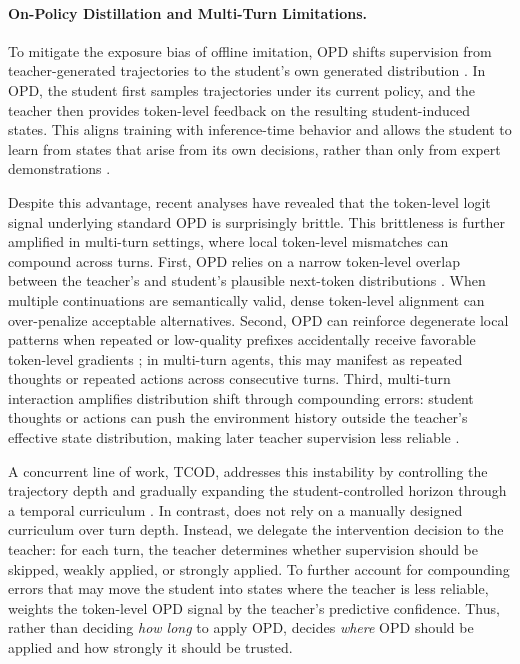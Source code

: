 \paragraph{On-Policy Distillation and Multi-Turn Limitations.}
To mitigate the exposure bias of offline imitation, OPD shifts supervision from teacher-generated trajectories to the student's own generated distribution \citep{agarwal2024policy, lu2025onpolicydistillation}. In OPD, the student first samples trajectories under its current policy, and the teacher then provides token-level feedback on the resulting student-induced states. This aligns training with inference-time behavior and allows the student to learn from states that arise from its own decisions, rather than only from expert demonstrations \citep{zhao2026self, he2026self, hubotter2026reinforcement}.

Despite this advantage, recent analyses have revealed that the token-level logit signal underlying standard OPD is surprisingly brittle. This brittleness is further amplified in multi-turn settings, where local token-level mismatches can compound across turns. First, OPD relies on a narrow token-level overlap between the teacher's and student's plausible next-token distributions \citep{li2026rethinking}. When multiple continuations are semantically valid, dense token-level alignment can over-penalize acceptable alternatives. Second, OPD can reinforce degenerate local patterns when repeated or low-quality prefixes accidentally receive favorable token-level gradients \citep{luo2026demystifying}; in multi-turn agents, this may manifest as repeated thoughts or repeated actions across consecutive turns. Third, multi-turn interaction amplifies distribution shift through compounding errors: student thoughts or actions can push the environment history outside the teacher's effective state distribution, making later teacher supervision less reliable \citep{wang2026tcod, li2025beyond}.

A concurrent line of work, TCOD, addresses this instability by controlling the trajectory depth and gradually expanding the student-controlled horizon through a temporal curriculum \citep{wang2026tcod}. In contrast, \ours{} does not rely on a manually designed curriculum over turn depth. Instead, we delegate the intervention decision to the teacher: for each turn, the teacher determines whether supervision should be skipped, weakly applied, or strongly applied. To further account for compounding errors that may move the student into states where the teacher is less reliable, \ours{} weights the token-level OPD signal by the teacher's predictive confidence. Thus, rather than deciding \emph{how long} to apply OPD, \ours{} decides \emph{where} OPD should be applied and how strongly it should be trusted.